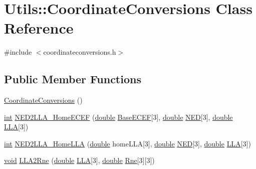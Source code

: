 \hypertarget{class_utils_1_1_coordinate_conversions}{\section{Utils\-:\-:Coordinate\-Conversions Class Reference}
\label{class_utils_1_1_coordinate_conversions}
}


{\ttfamily \#include $<$coordinateconversions.\-h$>$}

\subsection*{Public Member Functions}
\begin{DoxyCompactItemize}
\item 
\hyperlink{class_utils_1_1_coordinate_conversions_a67dec67c0b9491d9b3135d5cc6ad67d1}{Coordinate\-Conversions} ()
\item 
\hyperlink{ioapi_8h_a787fa3cf048117ba7123753c1e74fcd6}{int} \hyperlink{class_utils_1_1_coordinate_conversions_ae2c8e0f3a749495b4fce5a42dff87302}{N\-E\-D2\-L\-L\-A\-\_\-\-Home\-E\-C\-E\-F} (\hyperlink{_super_l_u_support_8h_a8956b2b9f49bf918deed98379d159ca7}{double} \hyperlink{_o_p_plots_8m_ac1ec51a7dd6d455e7752b2436fd61a0c}{Base\-E\-C\-E\-F}\mbox{[}3\mbox{]}, \hyperlink{_super_l_u_support_8h_a8956b2b9f49bf918deed98379d159ca7}{double} \hyperlink{_o_p_plots_8m_abb3119256791e93ec6e33c8eee7035d6}{N\-E\-D}\mbox{[}3\mbox{]}, \hyperlink{_super_l_u_support_8h_a8956b2b9f49bf918deed98379d159ca7}{double} \hyperlink{_o_p_plots_8m_ac4d07718b2724e836be86fbe0c8c5704}{L\-L\-A}\mbox{[}3\mbox{]})
\item 
\hyperlink{ioapi_8h_a787fa3cf048117ba7123753c1e74fcd6}{int} \hyperlink{class_utils_1_1_coordinate_conversions_aa8dc93690408a9522db08f0a13ec12e1}{N\-E\-D2\-L\-L\-A\-\_\-\-Home\-L\-L\-A} (\hyperlink{_super_l_u_support_8h_a8956b2b9f49bf918deed98379d159ca7}{double} home\-L\-L\-A\mbox{[}3\mbox{]}, \hyperlink{_super_l_u_support_8h_a8956b2b9f49bf918deed98379d159ca7}{double} \hyperlink{_o_p_plots_8m_abb3119256791e93ec6e33c8eee7035d6}{N\-E\-D}\mbox{[}3\mbox{]}, \hyperlink{_super_l_u_support_8h_a8956b2b9f49bf918deed98379d159ca7}{double} \hyperlink{_o_p_plots_8m_ac4d07718b2724e836be86fbe0c8c5704}{L\-L\-A}\mbox{[}3\mbox{]})
\item 
\hyperlink{group___u_a_v_objects_plugin_ga444cf2ff3f0ecbe028adce838d373f5c}{void} \hyperlink{class_utils_1_1_coordinate_conversions_afed986b1a4f6cee14a6cf505dd6cf8fd}{L\-L\-A2\-Rne} (\hyperlink{_super_l_u_support_8h_a8956b2b9f49bf918deed98379d159ca7}{double} \hyperlink{_o_p_plots_8m_ac4d07718b2724e836be86fbe0c8c5704}{L\-L\-A}\mbox{[}3\mbox{]}, \hyperlink{_super_l_u_support_8h_a8956b2b9f49bf918deed98379d159ca7}{double} \hyperlink{_o_p_plots_8m_a9e7515ae37ebdec7707b65891f31cd6d}{Rne}\mbox{[}3\mbox{]}\mbox{[}3\mbox{]})

\end{DoxyCompactItemize}
